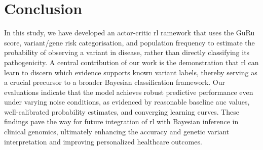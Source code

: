 \section{Conclusion}
In this study, we have developed an actor-critic \ac{rl} ramework that uses the GuRu score, variant/gene risk categorisation, and population frequency to estimate the probability of observing a variant in disease, rather than directly classifying its pathogenicity. A central contribution of our work is the demonstration that \ac{rl} can learn to discern which evidence supports known variant labels, thereby serving as a crucial precursor to a broader Bayesian classification framework. Our evaluations indicate that the model achieves robust predictive performance even under varying noise conditions, as evidenced by reasonable baseline \ac{auc} values, well-calibrated probability estimates, and converging learning curves. These findings pave the way for future integration of \ac{rl} with Bayesian inference in clinical genomics, ultimately enhancing the accuracy and genetic variant interpretation and improving personalized healthcare outcomes.

\clearpage

  


